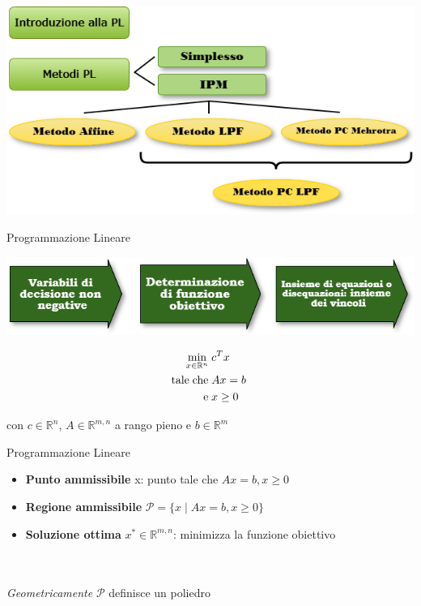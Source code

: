 
\begin{frame}[t,plain]
\titlepage
\end{frame}


\begin{frame}
\includegraphics[width = 11 cm]{intro.png}
\end{frame}


\begin{frame}{\textrm {Programmazione Lineare}}
	\begin{center}
	\transblindsvertical\includegraphics[width = 9 cm]{fasi.png}
	\end{center}
\pause
\begin{equation*}
\begin{split}
\min\limits_{x\in\mathbb{R}^{n}}\;&c^{T}x\\
\text{tale\;che\;}&Ax= b\;\\\text{e\;}&x\geq0
\end{split}
\end{equation*}
\begin{center}
con $c\in\mathbb{R}^{n}$, $A\in\mathbb{R}^{m,n}$ a rango pieno e $b\in\mathbb{R}^{m}$
\end{center}	
\end{frame}


\begin{frame}{\textrm{Programmazione Lineare}}
	\pause
	\begin{itemize}
		\item \textbf{Punto ammissibile} x: punto tale che $Ax = b, x\geq 0$
		\pause
		\item \textbf{Regione ammissibile} $\mathcal{P}=\{x\;|\; Ax = b, x\geq 0\}$
		\pause
		\item \textbf{Soluzione ottima} $x^{*}\in\mathbb{R}^{m,n}$: minimizza la funzione obiettivo
		\pause
	\end{itemize}
\pause
\\
\\
\centering\emph{Geometricamente} $\mathcal{P}$ definisce un poliedro
\end{frame}


